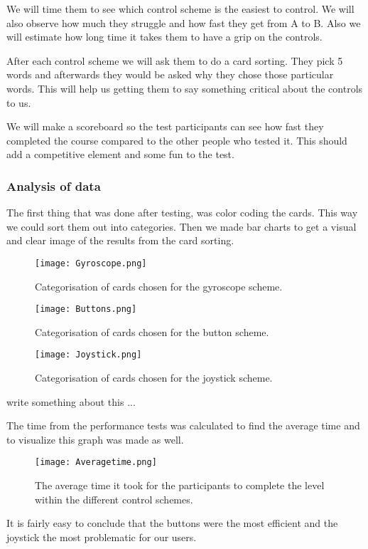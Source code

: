 We will time them to see which control scheme is the easiest to control. We will also observe how much they struggle and how fast they get from A to B. Also we will estimate how long time it takes them to have a grip on the controls.

After each control scheme we will ask them to do a card sorting. They pick 5 words and afterwards they would be asked why they chose those particular words. This will help us getting them to say something critical about the controls to us. 

We will make a scoreboard so the test participants can see how fast they completed the course compared to the other people who tested it.
This should add a competitive element and some fun to the test.

\subsubsection{Analysis of data}

The first thing that was done after testing, was color coding the cards. This way we could sort them out into categories. 
Then we made bar charts to get a visual and clear image of the results from the card sorting.

\begin{figure}[H]
\centering
\texttt{[image: Gyroscope.png]}
\caption{Categorisation of cards chosen for the gyroscope scheme.}
\end{figure}

\begin{figure}[H]
\centering
\texttt{[image: Buttons.png]}
\caption{Categorisation of cards chosen for the button scheme.}
\end{figure}

\begin{figure}[H]
\centering
\texttt{[image: Joystick.png]}
\caption{Categorisation of cards chosen for the joystick scheme.}
\end{figure}

write something about this ...

The time from the performance tests was calculated to find the average time and to visualize this graph was made as well. 

\begin{figure}[H]
\centering
\texttt{[image: Averagetime.png]}
\caption{The average time it took for the participants to complete the level within the different control schemes. }
\end{figure}

It is fairly easy to conclude that the buttons were the most efficient and the joystick the most problematic for our users. 


